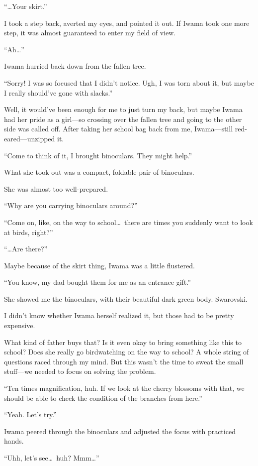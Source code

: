 \documentclass[
    a4paper,
    12pt,
    twoside,
    openany,
    UTF8,
    fontset=windows
]{ctexbook}
\begin{document}
``\dots Your skirt.''

I took a step back, averted my eyes, and pointed it out. If Iwama took one more step, it was almost guaranteed to enter my field of view.

``Ah\dots''

Iwama hurried back down from the fallen tree.

``Sorry! I was so focused that I didn't notice. Ugh, I was torn about it, but maybe I really should've gone with slacks.''

Well, it would've been enough for me to just turn my back, but maybe Iwama had her pride as a girl---so crossing over the fallen tree and going to the other side was called off. After taking her school bag back from me, Iwama---still red-eared---unzipped it.

``Come to think of it, I brought binoculars. They might help.''

What she took out was a compact, foldable pair of binoculars.

She was almost too well-prepared.

``Why are you carrying binoculars around?''

``Come on, like, on the way to school\dots\ there are times you suddenly want to look at birds, right?''

``\dots Are there?''

Maybe because of the skirt thing, Iwama was a little flustered.

``You know, my dad bought them for me as an entrance gift.''

She showed me the binoculars, with their beautiful dark green body. Swarovski.

I didn't know whether Iwama herself realized it, but those had to be pretty expensive.

What kind of father buys that? Is it even okay to bring something like this to school? Does she really go birdwatching on the way to school? A whole string of questions raced through my mind. But this wasn't the time to sweat the small stuff---we needed to focus on solving the problem.

``Ten times magnification, huh. If we look at the cherry blossoms with that, we should be able to check the condition of the branches from here.''

``Yeah. Let's try.''

Iwama peered through the binoculars and adjusted the focus with practiced hands.

``Uhh, let's see\dots\ huh? Mmm\dots''
\end{document}
